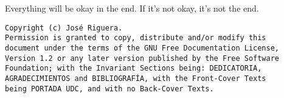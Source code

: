 %
%
\pagestyle{plain}

\begin{flushright}
\begin{scriptsize}
Everything will be okay in the end. 
If it's not okay, it's not the end.
\end{scriptsize}
\end{flushright}

\vspace*{17cm}

\begin{flushleft}
\begin{scriptsize}
\begin{verbatim}
Copyright (c) José Riguera.
Permission is granted to copy, distribute and/or modify this
document under the terms of the GNU Free Documentation License,
Version 1.2 or any later version published by the Free Software
Foundation; with the Invariant Sections being: DEDICATORIA,
AGRADECIMIENTOS and BIBLIOGRAFÍA, with the Front-Cover Texts
being PORTADA UDC, and with no Back-Cover Texts.
\end{verbatim}
\end{scriptsize}
\end{flushleft}
